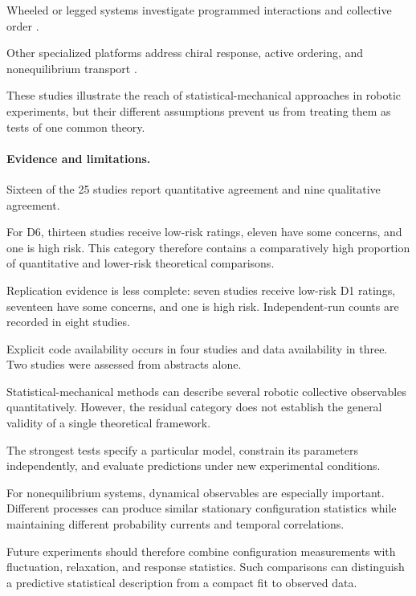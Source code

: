 Wheeled or legged systems investigate
programmed interactions and collective
order
\cite{Sankar2026trendformationwith,Turgut2008selforganizedflocka,Nishinari2006modellingofselfdr,Spears2004distributedphysics,Barone2024experimentalandnum,Rezeck2021flockingsegregative}.

Other specialized platforms address
chiral response, active ordering,
and nonequilibrium transport
\cite{Li2024memoryinducedspont,Bo2026threephasesofodd,Das2025roleofkinematicco,Kaeser2025individualandcolle}.

These studies illustrate the reach
of statistical-mechanical approaches
in robotic experiments, but their
different assumptions prevent us
from treating them as tests
of one common theory.

\paragraph*{Evidence and limitations.}

Sixteen of the 25 studies report
quantitative agreement and nine
qualitative agreement.

For D6, thirteen studies receive
low-risk ratings, eleven have
some concerns, and one is high risk.
This category therefore contains
a comparatively high proportion
of quantitative and lower-risk
theoretical comparisons.

Replication evidence is less complete:
seven studies receive low-risk
D1 ratings, seventeen have
some concerns, and one is high risk.
Independent-run counts are
recorded in eight studies.

Explicit code availability occurs
in four studies and data availability
in three. Two studies were assessed
from abstracts alone.

Statistical-mechanical methods can
describe several robotic collective
observables quantitatively. However,
the residual category does not
establish the general validity
of a single theoretical framework.

The strongest tests specify a
particular model, constrain its
parameters independently, and
evaluate predictions under
new experimental conditions.

For nonequilibrium systems,
dynamical observables are especially
important. Different processes can
produce similar stationary
configuration statistics while
maintaining different probability
currents and temporal correlations.

Future experiments should therefore
combine configuration measurements
with fluctuation, relaxation,
and response statistics.
Such comparisons can distinguish
a predictive statistical description
from a compact fit to observed data.

